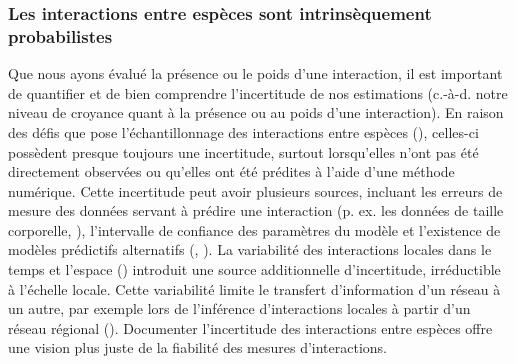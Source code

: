 \subsubsection{Les interactions entre espèces sont intrinsèquement probabilistes} 

Que nous ayons évalué la présence ou le poids d'une interaction, il est
important de quantifier et de bien comprendre l'incertitude de nos estimations
(c.-à-d. notre niveau de croyance quant à la présence ou au poids d'une
interaction). En raison des défis que pose l'échantillonnage des interactions
entre espèces (\cite{Jordano2016Sampling}), celles-ci possèdent presque toujours
une incertitude, surtout lorsqu'elles n'ont pas été directement observées ou
qu'elles ont été prédites à l'aide d'une méthode numérique. Cette incertitude
peut avoir plusieurs sources, incluant les erreurs de mesure des données servant
à prédire une interaction (p. ex. les données de taille corporelle,
\cite{Gravel2013Inferring}), l'intervalle de confiance des paramètres du modèle
et l'existence de modèles prédictifs alternatifs (\cite{Simmonds2022Insights},
\cite{Simmonds2024Recommendations}). La variabilité des interactions locales
dans le temps et l'espace (\cite{Poisot2015Species}) introduit une source
additionnelle d'incertitude, irréductible à l'échelle locale. Cette variabilité
limite le transfert d'information d'un réseau à un autre, par exemple lors de
l'inférence d'interactions locales à partir d'un réseau régional
(\cite{Dansereau2024Spatially}). Documenter l'incertitude des interactions entre
espèces offre une vision plus juste de la fiabilité des mesures d'interactions.

